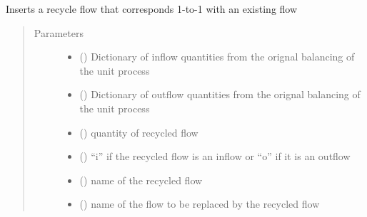 \documentclass[a4paper,10pt,english]{sphinxmanual}
\begin{document}
\begin{fulllineitems}
\label{\detokenize{unit:unitprocess.UnitProcess.recycle_1to1}}
Inserts a recycle flow that corresponds 1-to-1 with an existing flow
\begin{quote}\begin{description}
\item[{Parameters}] \leavevmode\begin{itemize}
\item {} 
 () \textendash{} Dictionary of inflow quantities
from the orignal balancing of the unit process

\item {} 
 () \textendash{} Dictionary of outflow
quantities from the orignal balancing of the unit process

\item {} 
 () \textendash{} quantity of recycled flow

\item {} 
 () \textendash{} “i” if the recycled flow is an inflow or “o” if
it is an outflow

\item {} 
 () \textendash{} name of the recycled flow

\item {} 
 () \textendash{} name of the flow to be replaced by the recycled flow


\end{itemize}
\end{description}
\end{quote}
\end{fulllineitems}
\end{document}
